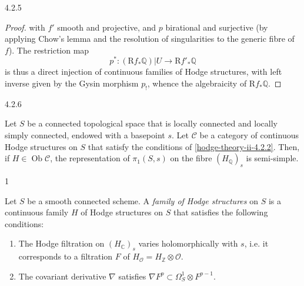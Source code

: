 \begin{proposition}{4.2.5}
\begin{proof}

      with \(f'\) smooth and projective, and \(p\) birational and surjective (by applying Chow's lemma and the resolution of singularities to the generic fibre of \(f\)).
      The restriction map
      \[         p^*\colon  (\mathrm {R} f_*\mathbb {Q})|U \to  \mathrm {R} f'_*\mathbb {Q}       \]
      is thus a direct injection of continuous families of Hodge structures, with left inverse given by the Gysin morphism \(p_!\), whence the algebraicity of \(\mathrm {R} f_*\mathbb {Q}\).\end{proof}\end{proposition}\begin{theorem}{4.2.6}\label{hodge-theory-ii-4.2.6}\skipsinglepar\par{}Let \(S\) be a connected topological space that is locally connected and locally simply connected, endowed with a basepoint \(s\).
    Let \(\mathcal {C}\) be a category of continuous Hodge structures on \(S\) that satisfy the conditions of \cref{hodge-theory-ii-4.2.2}.
    Then, if \(H\in \operatorname {Ob}\mathcal {C}\), the representation of \(\pi _1(S,s)\) on the fibre \((H_\mathbb {Q})_s\) is semi-simple.\end{theorem}\begin{footnote}{1}\label{hodge-theory-ii-4.2.6-footnote-1}\skipsinglepar\par{}Let \(S\) be a smooth connected scheme.
    A \emph{family of Hodge structures} on \(S\) is a continuous family \(H\) of Hodge structures on \(S\) that satisfies the following conditions:

    
 \begin{enumerate}
      
 \item[(a)]
        The Hodge filtration on \((H_\mathbb {C})_s\) varies holomorphically with \(s\), i.e. it corresponds to a filtration \(F\) of \(H_\mathcal {O}=H_\mathbb {Z}\otimes \mathcal {O}\).
      

      
 \item[(b)]
        The covariant derivative \(\nabla \) satisfies \(\nabla  F^p\subset \Omega _S^1\otimes  F^{p-1}\).
      


\end{enumerate}
\end{footnote}
